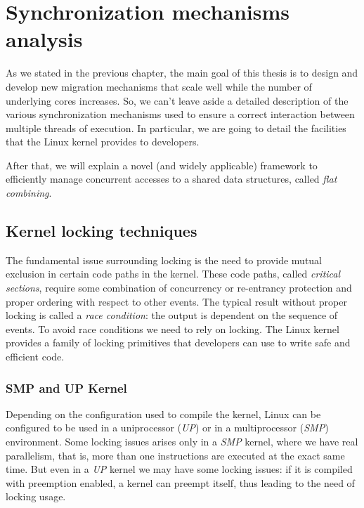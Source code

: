 \chapter{Synchronization mechanisms analysis\label{chap:sync_mechanisms}}

As we stated in the previous chapter, the main goal of this thesis is to 
design and develop new migration mechanisms that scale well while the number
of underlying cores increases. So, we can't leave aside a detailed description
of the various synchronization mechanisms used to ensure a correct interaction
between multiple threads of execution. In particular, we are going to detail
the facilities that the Linux kernel provides to developers.

After that, we will explain a novel (and widely applicable) framework to 
efficiently manage  concurrent accesses to a shared data structures, 
called \emph{flat combining}.

\section{Kernel locking techniques\label{sec:kernel_lock}}

The fundamental issue surrounding locking is the need to provide mutual exclusion 
in certain code paths in the kernel. These code paths, called \emph{critical sections},
require some combination of concurrency or re-entrancy protection and proper ordering
with respect to other events. The typical result without proper locking is called a
\emph{race condition}: the output is dependent on the sequence of events.
To avoid race conditions we need to rely on locking. The Linux kernel provides a 
family of locking primitives that developers can use to write safe and efficient code.

\subsection{SMP and UP Kernel\label{sec:SMP_UP}}
Depending on the configuration used to compile the kernel, Linux can be configured to
be used in a uniprocessor (\emph{UP}) or in a multiprocessor (\emph{SMP}) environment.
Some locking issues arises only in a \emph{SMP} kernel, where we have real parallelism,
that is, more than one instructions are executed at the exact same time. But even in a
\emph{UP} kernel we may have some locking issues: if it is compiled with preemption enabled,
a kernel can preempt itself, thus leading to the need of locking usage.


